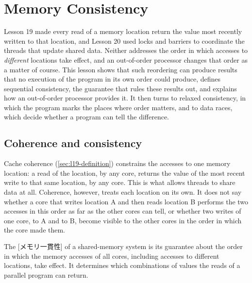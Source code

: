 \documentclass[../main.tex]{subfiles}
\begin{document}
\chapter{Memory Consistency}

Lesson 19 made every read of a memory location return the value most
recently written to that location, and Lesson 20 used locks and barriers to
coordinate the threads that update shared data.  Neither addresses the order
in which accesses to \emph{different} locations take effect, and an
out-of-order processor changes that order as a matter of course.  This lesson
shows that such reordering can produce results that no execution of the
program in its own order could produce, defines sequential consistency, the
guarantee that rules these results out, and explains how an out-of-order
processor provides it.  It then turns to relaxed consistency, in which the
program marks the places where order matters, and to data races, which decide
whether a program can tell the difference.

\section{Coherence and consistency}
\label{sec:l21-coherence}

Cache coherence (\cref{sec:l19-definition}) constrains the accesses to one
memory location: a read of the location, by any core, returns the value of
the most recent write to that same location, by any core.  This is what allows threads to share data at all.
Coherence, however, treats each location on its own.  It does not say whether
a core that writes location A and then reads location B performs the two
accesses in this order as far as the other cores can tell, or whether two
writes of one core, to A and to B, become visible to the other cores in the
order in which the core made them.

\begin{definition}
  The [メモリ一貫性] of a shared-memory system is its
  guarantee about the order in which the memory accesses of all cores,
  including accesses to different locations, take effect.  It determines
  which combinations of values the reads of a parallel program can return.
\end{definition}
\end{document}

